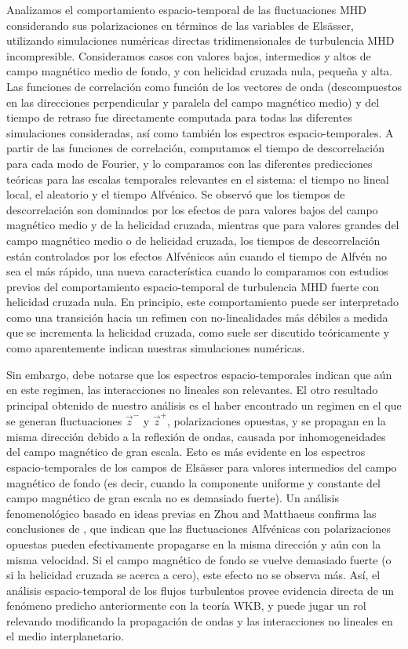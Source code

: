 Analizamos el comportamiento espacio-temporal de las fluctuaciones MHD
considerando sus polarizaciones en términos de las variables de
Els\"asser, utilizando simulaciones numéricas directas
tridimensionales de turbulencia MHD incompresible. Consideramos casos
con valores bajos, intermedios y altos de campo magnético medio de
fondo, y con helicidad cruzada nula, pequeña y alta. Las funciones de
correlación como función de los vectores de onda (descompuestos en las
direcciones perpendicular y paralela del campo magnético medio) y del
tiempo de retraso fue directamente computada para todas las diferentes
simulaciones consideradas, así como también los espectros
espacio-temporales. A partir de las funciones de correlación,
computamos el tiempo de descorrelación para cada modo de Fourier, y lo
comparamos con las diferentes predicciones teóricas para las escalas
temporales relevantes en el sistema: el tiempo no lineal local, el
\sweeping aleatorio y el tiempo Alfvénico. Se observó que los tiempos
de descorrelación son dominados por los efectos de \sweeping para
valores bajos del campo magnético medio y de la helicidad cruzada,
mientras que para valores grandes del campo magnético medio o de
helicidad cruzada, los tiempos de descorrelación están controlados por
los efectos Alfvénicos aún cuando el tiempo de Alfvén no sea el más
rápido, una nueva característica cuando lo comparamos con estudios
previos del comportamiento espacio-temporal de turbulencia MHD fuerte
con helicidad cruzada nula. En principio, este comportamiento puede
ser interpretado como una transición hacia un refimen con
no-linealidades más débiles a medida que se incrementa la helicidad
cruzada, como suele ser discutido teóricamente y como aparentemente
indican nuestras simulaciones numéricas.

Sin embargo, debe notarse que los espectros espacio-temporales indican
que aún en este regimen, las interacciones no lineales son
relevantes. El otro resultado principal obtenido de nuestro análisis
es el haber encontrado un regimen en el que se generan fluctuaciones
$\vec{z}^-$ y $\vec{z}^+$, polarizaciones opuestas, y se propagan en
la misma dirección debido a la reflexión de ondas, causada por
inhomogeneidades del campo magnético de gran escala. Esto es más
evidente en los espectros espacio-temporales de los campos de
Els\"asser para valores intermedios del campo magnético de fondo (es
decir, cuando la componente uniforme y constante del campo magnético
de gran escala no es demasiado fuerte). Un análisis fenomenológico
basado en ideas previas en Zhou and Matthaeus \cite{zhou1990remarks}
confirma las conclusiones de \cite{hollweg_1990_wkb}, que indican que
las fluctuaciones Alfvénicas con polarizaciones opuestas pueden
efectivamente propagarse en la misma dirección y aún con la misma
velocidad.  Si el campo magnético de fondo se vuelve demasiado fuerte
(o si la helicidad cruzada se acerca a cero), este efecto no se
observa más. Así, el análisis espacio-temporal de los flujos
turbulentos provee evidencia directa de un fenómeno predicho
anteriormente con la teoría WKB, y puede jugar un rol relevando
modificando la propagación de ondas y las interacciones no lineales en
el medio interplanetario.


